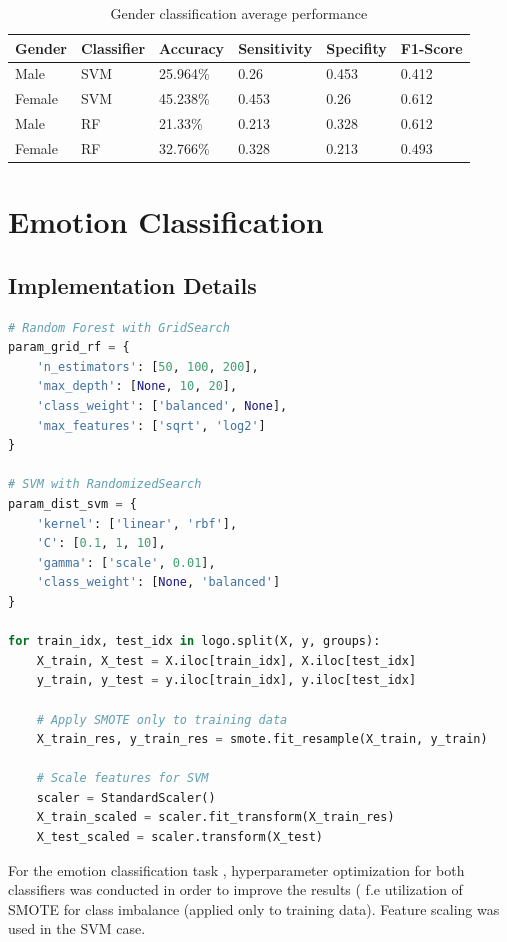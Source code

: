 \documentclass{article}
\begin{document}
\begin{table}[H]
\centering
\begin{tabular}{llllll}
\toprule
	Gender & Classifier & Accuracy & Sensitivity & Specifity & F1-Score \\
\midrule
	Male & SVM & 25.964\% & 0.26 & 0.453 & 0.412 \\
	Female & SVM & 45.238\% & 0.453 & 0.26 & 0.612 \\
	Male & RF & 21.33\% & 0.213 &  0.328 & 0.612 \\
	Female & RF & 32.766\% & 0.328 & 0.213 & 0.493 \\
\bottomrule
\end{tabular}
\caption{Gender classification average performance}
\end{table}

\section{Emotion Classification}
\subsection{Implementation Details}
\begin{lstlisting}[language=Python]
# Random Forest with GridSearch
param_grid_rf = {
    'n_estimators': [50, 100, 200],
    'max_depth': [None, 10, 20],
    'class_weight': ['balanced', None],
    'max_features': ['sqrt', 'log2']
}

# SVM with RandomizedSearch
param_dist_svm = {
    'kernel': ['linear', 'rbf'],
    'C': [0.1, 1, 10],           
    'gamma': ['scale', 0.01],     
    'class_weight': [None, 'balanced']
}

for train_idx, test_idx in logo.split(X, y, groups):
    X_train, X_test = X.iloc[train_idx], X.iloc[test_idx]
    y_train, y_test = y.iloc[train_idx], y.iloc[test_idx]
    
    # Apply SMOTE only to training data
    X_train_res, y_train_res = smote.fit_resample(X_train, y_train)
    
    # Scale features for SVM
    scaler = StandardScaler()
    X_train_scaled = scaler.fit_transform(X_train_res)
    X_test_scaled = scaler.transform(X_test)
\end{lstlisting}

For the emotion classification task , hyperparameter optimization for both classifiers was conducted in 
order to improve the results ( f.e utilization of SMOTE for class imbalance (applied only to training data). 
Feature scaling was used in the SVM case.
\end{document}
